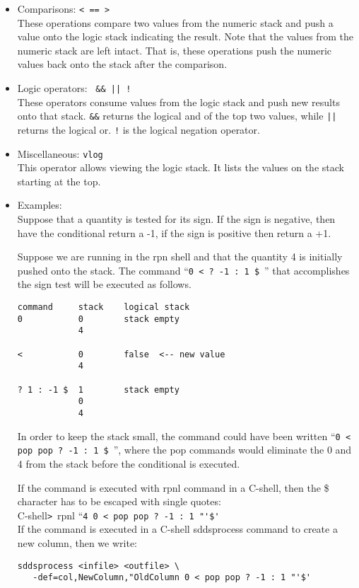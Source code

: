 \begin{itemize}
\begin{itemize}
\begin{itemize}
\item Comparisons: {\tt < == > }\\
These operations compare two values from the numeric stack and push a value onto the logic stack indicating the result.
Note that the values from the numeric stack are left intact.  That is, these operations push the numeric values back onto the
stack after the comparison.
\item Logic operators: \verb. && || !.\\
These operators consume values from the logic stack and push new results onto that stack.
\verb|&&| returns the logical and of the top two values, while {\tt ||} returns the logical or.
{\tt !} is the logical negation operator.
\item Miscellaneous: {\tt vlog}\\
This operator allows viewing the logic stack.  It lists the values on the stack starting at the top.

\item Examples:\\
Suppose that a quantity is tested for its sign.  If the sign is negative, then have the conditional return a -1, if the sign is positive then return a +1.

Suppose we are running in the rpn shell and that the quantity 4 is initially pushed onto the stack.  The command ``\verb.0 < ? -1 : 1 $.\ '' that accomplishes the sign test will be executed as follows.
\begin{flushleft}
\begin{verbatim}
command     stack    logical stack
0           0        stack empty
            4

<           0        false  <-- new value
            4

? 1 : -1 $  1        stack empty
            0  
            4
\end{verbatim}
\end{flushleft}
In order to keep the stack small, the command could have been written ``\verb.0 < pop pop ? -1 : 1 $.\ '', where the pop commands would eliminate the 0 and 4 from the stack before the conditional is executed.

If the command is executed with rpnl command in a C-shell, then the \$
character has to be escaped with single quotes:\\

C-shell\verb.>.\ rpnl ``\verb.4 0 < pop pop ? -1 : 1 "'$'.\\

If the command is executed in a C-shell sddsprocess command to create
a new column, then we write:\\
\begin{flushleft}
\begin{verbatim}
sddsprocess <infile> <outfile> \
   -def=col,NewColumn,"OldColumn 0 < pop pop ? -1 : 1 "'$'


\end{verbatim}
\end{flushleft}
\end{itemize}
\end{itemize}
\end{itemize}
